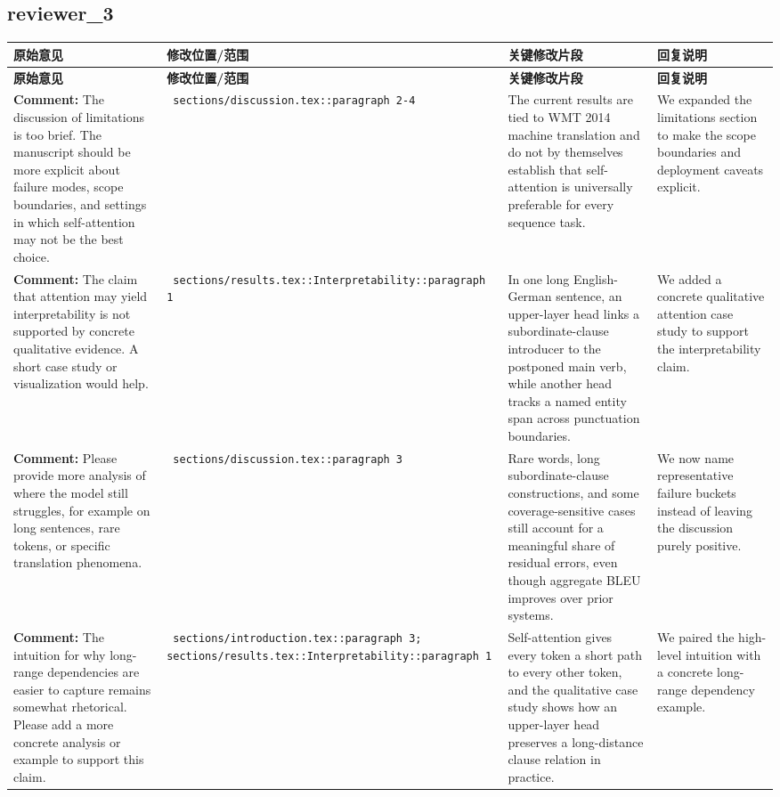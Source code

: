 \documentclass[11pt]{article}
\begin{document}
\subsection*{ reviewer_3 }
\begin{longtable}{|p{}|p{}|p{}|p{}|}
\hline
\textbf{原始意见} & \textbf{修改位置/范围} & \textbf{关键修改片段} & \textbf{回复说明} \\
\hline
\endfirsthead
\hline
\textbf{原始意见} & \textbf{修改位置/范围} & \textbf{关键修改片段} & \textbf{回复说明} \\
\hline
\endhead
\textbf{Comment:} The discussion of limitations is too brief. The manuscript should be more explicit about failure modes, scope boundaries, and settings in which self-attention may not be the best choice. & \texttt{ sections/discussion.tex::paragraph 2-4 } & {\color{blue}\ttfamily The current results are tied to WMT 2014 machine translation and do not by themselves establish that self-attention is universally preferable for every sequence task.} & We expanded the limitations section to make the scope boundaries and deployment caveats explicit. \\
\hline
\textbf{Comment:} The claim that attention may yield interpretability is not supported by concrete qualitative evidence. A short case study or visualization would help. & \texttt{ sections/results.tex::Interpretability::paragraph 1 } & {\color{blue}\ttfamily In one long English-German sentence, an upper-layer head links a subordinate-clause introducer to the postponed main verb, while another head tracks a named entity span across punctuation boundaries.} & We added a concrete qualitative attention case study to support the interpretability claim. \\
\hline
\textbf{Comment:} Please provide more analysis of where the model still struggles, for example on long sentences, rare tokens, or specific translation phenomena. & \texttt{ sections/discussion.tex::paragraph 3 } & {\color{blue}\ttfamily Rare words, long subordinate-clause constructions, and some coverage-sensitive cases still account for a meaningful share of residual errors, even though aggregate BLEU improves over prior systems.} & We now name representative failure buckets instead of leaving the discussion purely positive. \\
\hline
\textbf{Comment:} The intuition for why long-range dependencies are easier to capture remains somewhat rhetorical. Please add a more concrete analysis or example to support this claim. & \texttt{ sections/introduction.tex::paragraph 3; sections/results.tex::Interpretability::paragraph 1 } & {\color{blue}\ttfamily Self-attention gives every token a short path to every other token, and the qualitative case study shows how an upper-layer head preserves a long-distance clause relation in practice.} & We paired the high-level intuition with a concrete long-range dependency example. \\

\end{longtable}
\end{document}
